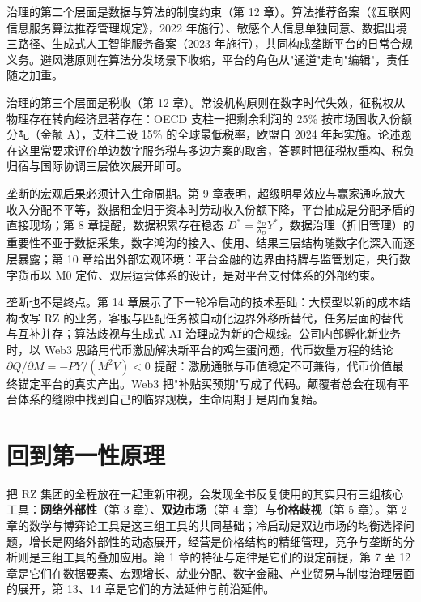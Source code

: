 治理的第二个层面是数据与算法的制度约束（第 12 章）。算法推荐备案（《互联网信息服务算法推荐管理规定》，2022 年施行）、敏感个人信息单独同意、数据出境三路径、生成式人工智能服务备案（2023 年施行），共同构成垄断平台的日常合规义务。避风港原则在算法分发场景下收缩，平台的角色从"通道"走向"编辑"，责任随之加重。

治理的第三个层面是税收（第 12 章）。常设机构原则在数字时代失效，征税权从物理存在转向经济显著存在：OECD 支柱一把剩余利润的 25\% 按市场国收入份额分配（金额 A），支柱二设 15\% 的全球最低税率，欧盟自 2024 年起实施。论述题在这里常要求评价单边数字服务税与多边方案的取舍，答题时把征税权重构、税负归宿与国际协调三层依次展开即可。

垄断的宏观后果必须计入生命周期。第 9 章表明，超级明星效应与赢家通吃放大收入分配不平等，数据租金归于资本时劳动收入份额下降，平台抽成是分配矛盾的直接现场；第 8 章提醒，数据积累存在稳态 $D^{*}=\frac{s_D}{\delta_D}Y^{*}$，数据治理（折旧管理）的重要性不亚于数据采集，数字鸿沟的接入、使用、结果三层结构随数字化深入而逐层暴露；第 10 章给出外部宏观环境：平台金融的边界由持牌与监管划定，央行数字货币以 M0 定位、双层运营体系的设计，是对平台支付体系的外部约束。

垄断也不是终点。第 14 章展示了下一轮冷启动的技术基础：大模型以新的成本结构改写 RZ 的业务，客服与匹配任务被自动化边界外移所替代，任务层面的替代与互补并存；算法歧视与生成式 AI 治理成为新的合规线。公司内部孵化新业务时，以 Web3 思路用代币激励解决新平台的鸡生蛋问题，代币数量方程的结论 $\partial Q/\partial M=-PY/(M^{2}V)<0$ 提醒：激励通胀与币值稳定不可兼得，代币价值最终锚定平台的真实产出。Web3 把"补贴买预期"写成了代码。颠覆者总会在现有平台体系的缝隙中找到自己的临界规模，生命周期于是周而复始。

\section{回到第一性原理}

把 RZ 集团的全程放在一起重新审视，会发现全书反复使用的其实只有三组核心工具：\textbf{网络外部性}（第 3 章）、\textbf{双边市场}（第 4 章）与\textbf{价格歧视}（第 5 章）。第 2 章的数学与博弈论工具是这三组工具的共同基础；冷启动是双边市场的均衡选择问题，增长是网络外部性的动态展开，经营是价格结构的精细管理，竞争与垄断的分析则是三组工具的叠加应用。第 1 章的特征与定律是它们的设定前提，第 7 至 12 章是它们在数据要素、宏观增长、就业分配、数字金融、产业贸易与制度治理层面的展开，第 13、14 章是它们的方法延伸与前沿延伸。


